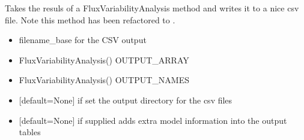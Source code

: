 \documentclass[letterpaper,10pt,english]{sphinxmanual}
\begin{document}
\begin{fulllineitems}
\label{\detokenize{modules_doc:cbmpy.CBCPLEX.cplx_WriteFVAtoCSV}}
\pysigstartsignatures
{}
\pysigstopsignatures
\sphinxAtStartPar
Takes the resuls of a FluxVariabilityAnalysis method and writes it to a nice
csv file. Note this method has been refactored to .
\begin{itemize}
\item {} 
\sphinxAtStartPar
{} filename\_base for the CSV output

\item {} 
\sphinxAtStartPar
{} FluxVariabilityAnalysis() OUTPUT\_ARRAY

\item {} 
\sphinxAtStartPar
{} FluxVariabilityAnalysis() OUTPUT\_NAMES

\item {} 
\sphinxAtStartPar
{} {[}default=None{]} if set the output directory for the csv files

\item {} 
\sphinxAtStartPar
{} {[}default=None{]} if supplied adds extra model information into the output tables

\end{itemize}

\end{fulllineitems}

\end{document}
